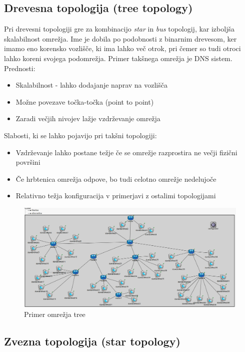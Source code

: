 \documentclass[11pt,a4paper,slovene]{myarticle}
\begin{document}
\subsection{Drevesna topologija (tree topology)}
Pri drevesni topologiji gre za kombinacijo \textit{star} in \textit{bus} topologij, kar izboljša skalabilnost omrežja. Ime je dobila po podobnosti z binarnim drevesom, ker imamo eno korensko vozlišče, ki ima lahko več otrok, pri čemer so tudi otroci lahko koreni svojega podomrežja. Primer takšnega omrežja je DNS sistem.\\
Prednosti:
\begin{itemize}
\item Skalabilnost - lahko dodajanje naprav na vozlišča
\item Možne povezave točka-točka (point to point)
\item Zaradi večjih nivojev lažje vzdrževanje omrežja 
\end{itemize}
Slabosti, ki se lahko pojavijo pri takšni topologiji:
\begin{itemize}
\item Vzdrževanje lahko postane težje če se omrežje razprostira ne večji fizični površini
\item Če hrbtenica omrežja odpove, bo tudi celotno omrežje nedelujoče
\item Relativno težja konfiguracija v primerjavi z ostalimi topologijami
\end{itemize}
\begin{figure}[H]
\includegraphics[scale=0.4]{slike/ipv6tree.png}
\caption{Primer omrežja tree}
\end{figure}

\subsection{Zvezna topologija (star topology)}
\end{document}
